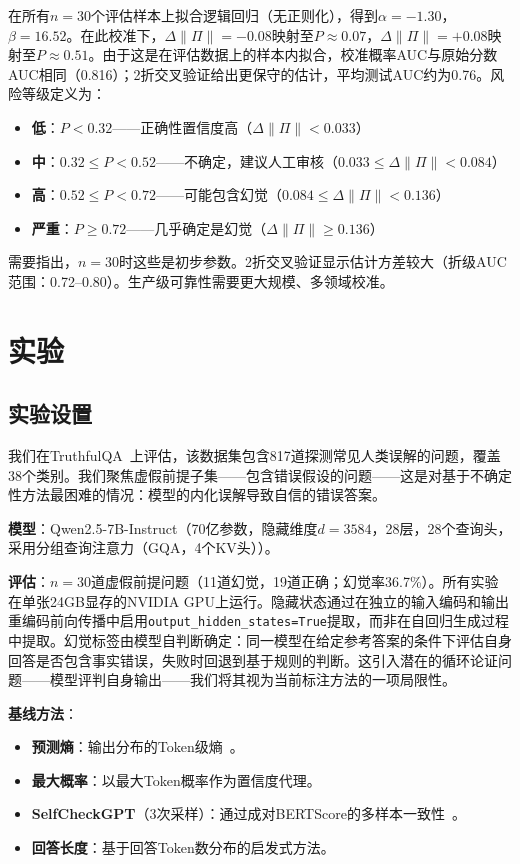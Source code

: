 \documentclass[11pt]{ctexart}
\begin{document}
在所有$n=30$个评估样本上拟合逻辑回归（无正则化），得到$\alpha = -1.30$，$\beta = 16.52$。在此校准下，$\Delta\|\Pi\| = -0.08$映射至$P \approx 0.07$，$\Delta\|\Pi\| = +0.08$映射至$P \approx 0.51$。由于这是在评估数据上的样本内拟合，校准概率AUC与原始分数AUC相同（0.816）；2折交叉验证给出更保守的估计，平均测试AUC约为0.76。风险等级定义为：
\begin{itemize}
  \item \textbf{低}：$P < 0.32$——正确性置信度高（$\Delta\|\Pi\| < 0.033$）
  \item \textbf{中}：$0.32 \leq P < 0.52$——不确定，建议人工审核（$0.033 \leq \Delta\|\Pi\| < 0.084$）
  \item \textbf{高}：$0.52 \leq P < 0.72$——可能包含幻觉（$0.084 \leq \Delta\|\Pi\| < 0.136$）
  \item \textbf{严重}：$P \geq 0.72$——几乎确定是幻觉（$\Delta\|\Pi\| \geq 0.136$）
\end{itemize}

需要指出，$n = 30$时这些是初步参数。2折交叉验证显示估计方差较大（折级AUC范围：0.72--0.80）。生产级可靠性需要更大规模、多领域校准。

\section{实验}

\subsection{实验设置}

我们在TruthfulQA~\cite{lin2022truthfulqa}上评估，该数据集包含817道探测常见人类误解的问题，覆盖38个类别。我们聚焦虚假前提子集——包含错误假设的问题——这是对基于不确定性方法最困难的情况：模型的内化误解导致自信的错误答案。

\textbf{模型}：Qwen2.5-7B-Instruct（70亿参数，隐藏维度$d = 3584$，28层，28个查询头，采用分组查询注意力（GQA，4个KV头））。

\textbf{评估}：$n = 30$道虚假前提问题（11道幻觉，19道正确；幻觉率36.7\%）。所有实验在单张24GB显存的NVIDIA GPU上运行。隐藏状态通过在独立的输入编码和输出重编码前向传播中启用\texttt{output\_hidden\_states=True}提取，而非在自回归生成过程中提取。幻觉标签由模型自判断确定：同一模型在给定参考答案的条件下评估自身回答是否包含事实错误，失败时回退到基于规则的判断。这引入潜在的循环论证问题——模型评判自身输出——我们将其视为当前标注方法的一项局限性。

\textbf{基线方法}：
\begin{itemize}
  \item \textbf{预测熵}：输出分布的Token级熵~\cite{kadavath2022language}。
  \item \textbf{最大概率}：以最大Token概率作为置信度代理。
  \item \textbf{SelfCheckGPT}（3次采样）：通过成对BERTScore的多样本一致性~\cite{manakul2023selfcheckgpt}。
  \item \textbf{回答长度}：基于回答Token数分布的启发式方法。
\end{itemize}
\end{document}
